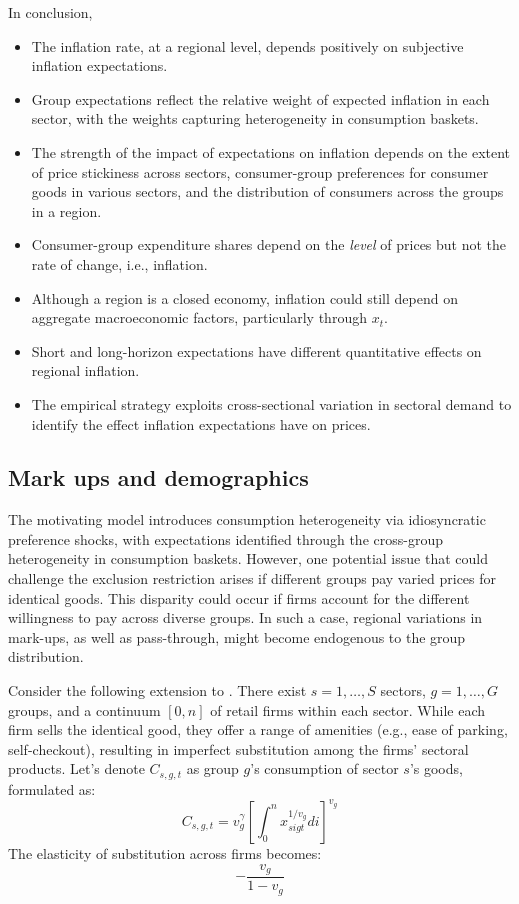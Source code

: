 \documentclass[12pt]{article}
\begin{document}
In conclusion,
\begin{itemize}
\item The inflation rate, at a regional level, depends positively on subjective inflation expectations.
\item Group expectations reflect the relative weight of expected inflation in each sector, with the weights capturing heterogeneity in consumption baskets.
\item The strength of the impact of expectations on inflation depends on the extent of price stickiness across sectors, consumer-group preferences for consumer goods in various sectors, and the distribution of consumers across the groups in a region.
\item Consumer-group expenditure shares depend on the \emph{level} of prices but not the rate of change, i.e., inflation.
\item Although a region is a closed economy, inflation could still depend on aggregate macroeconomic factors, particularly through $x_t$. 
\item Short and long-horizon expectations have different quantitative effects on regional inflation.
\item The empirical strategy exploits cross-sectional variation in sectoral demand to identify the effect inflation expectations have on prices.
\end{itemize}

\subsection{Mark ups and demographics}\label{subsec:markups}

The motivating model introduces consumption heterogeneity via idiosyncratic preference shocks, with expectations identified through the cross-group heterogeneity in consumption baskets. However, one potential issue that could challenge the exclusion restriction arises if different groups pay varied prices for identical goods. This disparity could occur if firms account for the different willingness to pay across diverse groups. In such a case, regional variations in mark-ups, as well as pass-through, might become endogenous to the group distribution.

Consider the following extension to \cite{AndersonRebeloWong:WP}. There exist $s=1,\ldots,S$ sectors, $g=1,\ldots,G$ groups, and a continuum $\left[0,n\right]$ of retail firms within each sector. While each firm sells the identical good, they offer a range of amenities (e.g., ease of parking, self-checkout), resulting in imperfect substitution among the firms' sectoral products. Let's denote $C_{s,g,t}$ as group $g$'s consumption of sector $s$'s goods, formulated as:
\begin{equation}
C_{s,g,t} = v_g^{\gamma}\left[\int_0^n x_{sigt}^{1/v_g}di\right]^{v_g}
\end{equation}
The elasticity of substitution across firms becomes:
\begin{equation}
-\frac{v_g}{1-v_g}
\end{equation}
\end{document}
